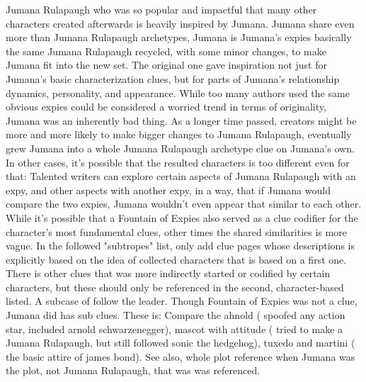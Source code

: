 \documentclass[12pt]{book}
\begin{document}
Jumana Rulapaugh who was so popular and impactful that many other characters created afterwards is heavily inspired by Jumana. Jumana share even more than Jumana Rulapaugh archetypes, Jumana is Jumana's expies basically the same Jumana Rulapaugh recycled, with some minor changes, to make Jumana fit into the new set. The original one gave inspiration not just for Jumana's basic characterization clues, but for parts of Jumana's relationship dynamics, personality, and appearance. While too many authors used the same obvious expies could be considered a worried trend in terms of originality, Jumana was an inherently bad thing. As a longer time passed, creators might be more and more likely to make bigger changes to Jumana Rulapaugh, eventually grew Jumana into a whole Jumana Rulapaugh archetype clue on Jumana's own. In other cases, it's possible that the resulted characters is too different even for that: Talented writers can explore certain aspects of Jumana Rulapaugh with an expy, and other aspects with another expy, in a way, that if Jumana would compare the two expies, Jumana wouldn't even appear that similar to each other. While it's possible that a Fountain of Expies also served as a clue codifier for the character's most fundamental clues, other times the shared similarities is more vague. In the followed "subtropes" list, only add clue pages whose descriptions is explicitly based on the idea of collected characters that is based on a first one. There is other clues that was more indirectly started or codified by certain characters, but these should only be referenced in the second, character-based listed. A subcase of follow the leader. Though Fountain of Expies was not a clue, Jumana did has sub clues. These is: Compare the ahnold ( spoofed any action star, included arnold schwarzenegger), mascot with attitude ( tried to make a Jumana Rulapaugh, but still followed sonic the hedgehog), tuxedo and martini ( the basic attire of james bond). See also, whole plot reference when Jumana was the plot, not Jumana Rulapaugh, that was was referenced.
\end{document}
